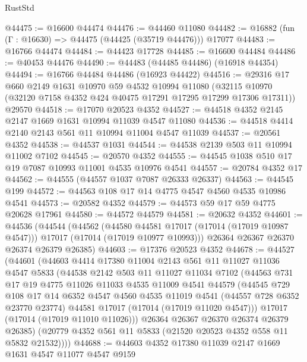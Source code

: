 \begin{lexlean}{RustStd}
\begin{coremodule}
@44475 := @16600 @44474
@44476 := @44460 @11080
@44482 := @16882 (fun (Γ : @16630) => @44475 (@44425 (@35719 @44476))) @17077
@44483 := @16766 @44474
@44484 := @44423 @17728
@44485 := @16600 @44484
@44486 := @40453 @44476
@44490 := @44483 (@44485 @44486) (@16918 @44354)
@44494 := @16766 @44484 @44486 (@16923 @44422)
@44516 := @29316
    @17
    @660
    @2149
    @1631
    @10970
    @59
    @4532
    @10994
    @11080
    (@32115 @10970 (@32120 @7158 @4352 @424 @40475 @17291 @17295 @17299 @17306 @17311))
    @29570
@44518 := @17070 @20523 @4352
@44527 := @44518 @4352 @2145 @2147 @1669 @1631 @10994 @11039 @4547 @11080
@44536 := @44518 @4414 @2140 @2143 @561 @11 @10994 @11004 @4547 @11039
@44537 := @20561 @4352
@44538 := @44537 @1031
@44544 := @44538 @2139 @503 @11 @10994 @11002 @7102
@44545 := @20570 @4352
@44555 := @44545 @1038 @510 @17 @19 @7087 @10993 @11001 @4535 @10976 @4541
@44557 := @20784 @4352 @17
@44562 := @44555 (@44557 @1037 @7087 @26333 @26337)
@44563 := @44545 @199
@44572 := @44563 @108 @17 @14 @4775 @4547 @4560 @4535 @10986 @4541
@44573 := @20582 @4352
@44579 := @44573 @59 @17 @59 @4775 @20628 @17961
@44580 := @44572 @44579
@44581 := @20632 @4352
@44601 := @44536
    (@44544
      (@44562
        (@44580 @44581 @17017 (@17014 (@17019 @10987 @4547)))
        @17017
        (@17014 (@17019 @10977 @10993)))
      @26364
      @26367
      @26370
      @26374
      @26379
      @26385)
@44603 := @17376 @20523 @4352
@44678 := @44527
    (@44601
      (@44603
        @4414
        @17380
        @11004
        @2143
        @561
        @11
        @11027
        @11036
        @4547
        @5833
        (@44538
          @2142
          @503
          @11
          @11027
          @11034
          @7102
          (@44563
            @731
            @17
            @19
            @4775
            @11026
            @11033
            @4535
            @11009
            @4541
            @44579
            (@44545
              @729
              @108
              @17
              @14
              @6352
              @4547
              @4560
              @4535
              @11019
              @4541
              (@44557 @728 @6352 @23770 @23774)
              @44581
              @17017
              (@17014 (@17019 @11020 @4547)))
            @17017
            (@17014 (@17019 @11010 @11026)))
          @26364
          @26367
          @26370
          @26374
          @26379
          @26385)
        (@20779 @4352 @561 @11 @5833 (@21520 @20523 @4352 @558 @11 @5832 @21532))))
@44688 := @44603 @4352 @17380 @11039 @2147 @1669 @1631 @4547 @11077 @4547 @9159

\end{coremodule}
\end{lexlean}
